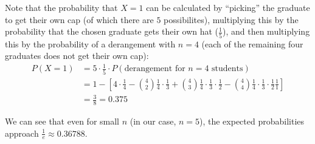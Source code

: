 \begin{enumerate}[a)]
    Note that the probability that $X=1$ can be calculated by ``picking'' the graduate to get their own cap (of which there are $5$ possibilites),
    multiplying this by the probability that the chosen graduate gets their own hat ($\frac{1}{5}$), and then multiplying this by the probability of a derangement with $n=4$ (each of the
    remaining four graduates does not get their own cap):
    \begin{align*}
        P(X = 1) &= 5 \cdot \frac{1}{5} \cdot P(\text{derangement for } n = 4 \text{ students}) \\
        &= 1 - \left[ 4 \cdot \frac{1}{4} - \binom{4}{2}\frac{1}{4} \cdot \frac{1}{3} + 
        \binom{4}{3}\frac{1}{4} \cdot \frac{1}{3} \cdot \frac{1}{2} - \binom{4}{4}\frac{1}{4} \cdot \frac{1}{3} \cdot \frac{1}{2} \frac{1}{1}\right] \\
        &= \frac{3}{8} = 0.375
    \end{align*}

    We can see that even for small $n$ (in our case, $n=5$), the expected probabilities approach $\frac{1}{e} \approx 0.36788$.

\end{enumerate}
